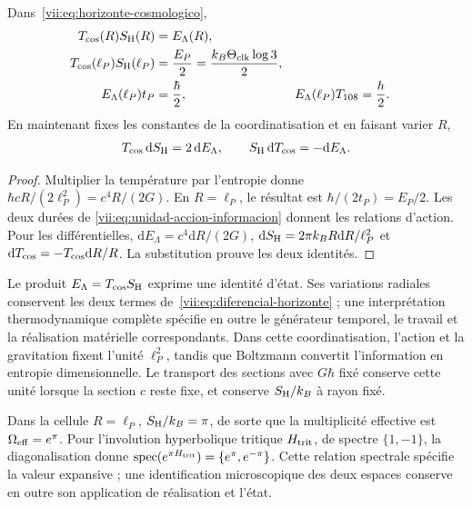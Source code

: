 \begin{theorem}
\label{vii:thm:celda-media-accion}
Dans~\eqref{vii:eq:horizonte-cosmologico},
\begin{align}
 T_{\rm cos}(R)S_{\rm H}(R)&=E_\Lambda(R),\\
 T_{\rm cos}(\ell_P)S_{\rm H}(\ell_P)
 &=\frac{E_P}{2}=\frac{k_B\Theta_{\rm clk}\log3}{2},\\
 E_\Lambda(\ell_P)t_P&=\frac{\hbar}{2},&
 E_\Lambda(\ell_P)T_{108}&=\frac h2.
 \label{vii:eq:media-accion-horizonte}
\end{align}
En maintenant fixes les constantes de la coordinatisation et en faisant varier \(R\),
\begin{equation}
 T_{\rm cos}\,\mathrm dS_{\rm H}=2\,\mathrm dE_\Lambda,
 \qquad S_{\rm H}\,\mathrm dT_{\rm cos}=-\mathrm dE_\Lambda.
 \label{vii:eq:diferencial-horizonte}
\end{equation}
\end{theorem}
\begin{proof}
Multiplier la température par l'entropie donne
\(\hbar cR/(2\ell_P^2)=c^4R/(2G)\).
En \(R=\ell_P\), le résultat est
\(\hbar/(2t_P)=E_P/2\). Les deux durées de
\eqref{vii:eq:unidad-accion-informacion} donnent les relations d'action.
Pour les différentielles,
\(\mathrm dE_\Lambda=c^4\mathrm dR/(2G)\),
\(\mathrm dS_{\rm H}=2\pi k_BR\mathrm dR/\ell_P^2\) et
\(\mathrm dT_{\rm cos}=-T_{\rm cos}\mathrm dR/R\).
La substitution prouve les deux identités.
\end{proof}

Le produit \(E_\Lambda=T_{\rm cos}S_{\rm H}\) exprime une identité d'état. Ses variations radiales conservent les deux termes de~\eqref{vii:eq:diferencial-horizonte} ; une interprétation thermodynamique complète spécifie en outre le générateur temporel, le travail et la réalisation matérielle correspondants. Dans cette coordinatisation, l'action et la gravitation fixent l'unité \(\ell_P^2\), tandis que Boltzmann convertit l'information en entropie dimensionnelle. Le transport des sections avec \(G\hbar\) fixé conserve cette unité lorsque la section \(c\) reste fixe, et conserve \(S_{\rm H}/k_B\) à rayon fixé.

Dans la cellule \(R=\ell_P\), \(S_{\rm H}/k_B=\pi\), de sorte que
la multiplicité effective est \(\Omega_{\rm eff}=e^\pi\).
Pour l'involution hyperbolique tritique \(H_{\rm trit}\), de spectre
\(\{1,-1\}\), la diagonalisation donne
\(\operatorname{spec}(e^{\pi H_{\rm trit}})=\{e^\pi,e^{-\pi}\}\).
Cette relation spectrale spécifie la valeur expansive ; une identification
microscopique des deux espaces conserve en outre son application de
réalisation et l'état.


